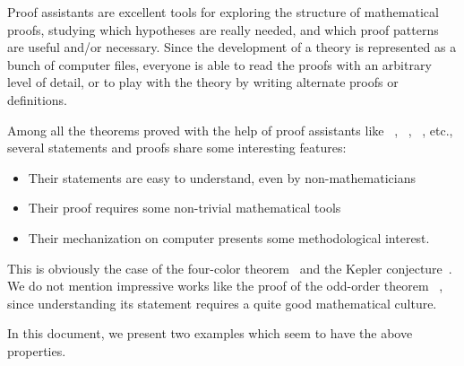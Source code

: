 \documentclass[twoside,a4paper]{book}
\begin{document}
Proof assistants are excellent tools for exploring the structure of mathematical proofs,
studying  which hypotheses are really needed, and which proof patterns are useful and/or
necessary. Since the development of a theory is represented as a bunch of computer files,
everyone is able to read the proofs with an arbitrary level of detail, or to play with the theory by writing alternate proofs or definitions.


Among all the theorems proved with the help of proof assistants like \coq{}~\cite{Coq,BC04}, \hol{}~\cite{HOL}, \isabelle{}~\cite{isabelle},  etc.,
several statements and proofs  share some interesting features:
\begin{itemize}
\item Their statements are easy to understand, even by non-mathematicians
\item Their proof requires some non-trivial mathematical tools
\item Their mechanization on computer presents some methodological interest.
\end{itemize}






This is obviously the case of the four-color theorem~\cite{fourcolors}  and the Kepler conjecture~\cite{flyspeck2015}. We do not mention impressive works like the proof of the odd-order theorem ~\cite{oddorderthm}, since understanding its statement requires a quite good mathematical culture.


In this document, we present two examples which seem to have the above properties.
\end{document}
